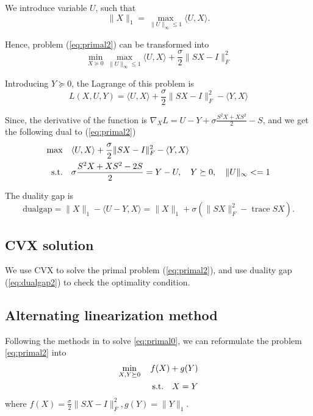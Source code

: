 \documentclass[conference,onecolumn,12pt]{IEEEtran}
\newcommand\tr{{{\operatorname{trace}}}}
\newcommand{\<}{\langle}
\renewcommand{\>}{\rangle}
\numberwithin{equation}{section}
\begin{document}
    We introduce variable ${U}$, such that
    \begin{equation}
        \|{X}\|_1 = \max_{\|{U}\|_{\infty}\leq 1} \<{U},{X}\>.
    \end{equation}

    Hence, problem (\ref{eq:primal2}) can be transformed into
    \begin{equation}
            \min_{{X}\succeq 0} \max_{\|{U}\|_{\infty}\leq 1} \<{U},{X}\>+ \frac{\sigma}{2}\|SX-I\|_F^2
    \end{equation}
    
    Introducing $Y\succeq 0$, the Lagrange of this problem is
    \begin{equation}
    L({X},{U},Y) = \<{U},{X}\>+ \frac{\sigma}{2}\|SX-I\|_F^2 -\<Y,X\>
    \end{equation}
    
    Since, the derivative of the function is $\nabla_{{X}} L = U-Y+\sigma \frac{S^2X+XS^2}{2}-S$, and we get the following dual to (\ref{eq:primal2})
    \begin{equation}
    \begin{split}
        \max\quad &\<{U},{X}\>+ \frac{\sigma}{2}\|SX-I\|_F^2 -\<Y,X\>\\
        {\rm s.t.}\quad & \sigma\frac{S^2X+XS^2-2S}{2} = Y-U,\quad Y\succeq 0,\quad \|U\|_\infty <= 1\\
    \end{split}
    \end{equation}

    The duality gap is
    \begin{equation}
        \mathrm{dualgap} = \|X\|_1-\<U-Y,X\> = \|X\|_1+\sigma(\|SX\|_F^2-\tr{SX}).
        \label{eq:dualgap2}
    \end{equation}
    
    \subsection{CVX solution}
    We use CVX to solve the primal problem (\ref{eq:primal2}), and use duality
    gap (\ref{eq:dualgap2}) to check the optimality condition.
    \subsection{Alternating linearization method}
    Following the methods in \cite{yang2011alternating} to solve \ref{eq:primal0}, we can reformulate the problem \ref{eq:primal2} into
    \begin{equation}
        \begin{split}
            \min_{X,Y\succeq 0}\quad f(X)+g(Y)\\
            {\rm s.t.}\quad X = Y
        \end{split}
    \end{equation}
where $f(X) = \frac{\sigma}{2}\|SX-I\|_F^2, g(Y) = \|Y\|_1$.
\end{document}
